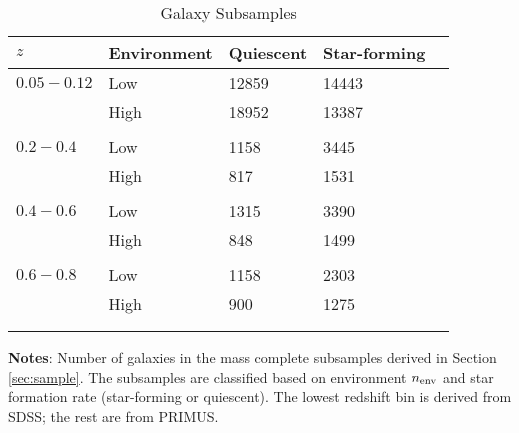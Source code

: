 \documentclass{emulateapj}
\begin{document}
\begin{table} %
  \caption{Galaxy Subsamples}
  \label{tab:subsample}
  \begin{center}
    \leavevmode
    \begin{tabular}{lllll} \hline \hline              
    $z$ &Environment        &Quiescent  &Star-forming  \\ \hline 
$0.05-0.12$ &Low           &12859                       &14443                           \\
               &High            &18952                       &13387                           \\ 
                              &               &                       &                           \\ \hline
$0.2-0.4$      &Low           &1158                    &3445                           \\
               &High            &817                    &1531                           \\
               &               &                       &                           \\ \hline
$0.4-0.6$      &Low           &1315                       &3390                           \\
               &High            &848                       &1499                           \\
               &               &                       &                           \\ \hline
$0.6-0.8$      &Low           &1158                       &2303                           \\
               &High            &900                       &1275                           \\
               &               &                       &                           \\ \hline
  \multicolumn{4}{l}{}                                             \\       
    \end{tabular} \par
    \end{center}
    {\bf Notes}: Number of galaxies in the mass complete subsamples derived in Section \ref{sec:sample}. The subsamples are classified based on environment $n_{\rm{env}}$ and star formation rate (star-forming or quiescent). The lowest redshift bin is derived from SDSS; the rest are from PRIMUS. 
    \bigskip
\end{table}
\end{document}
